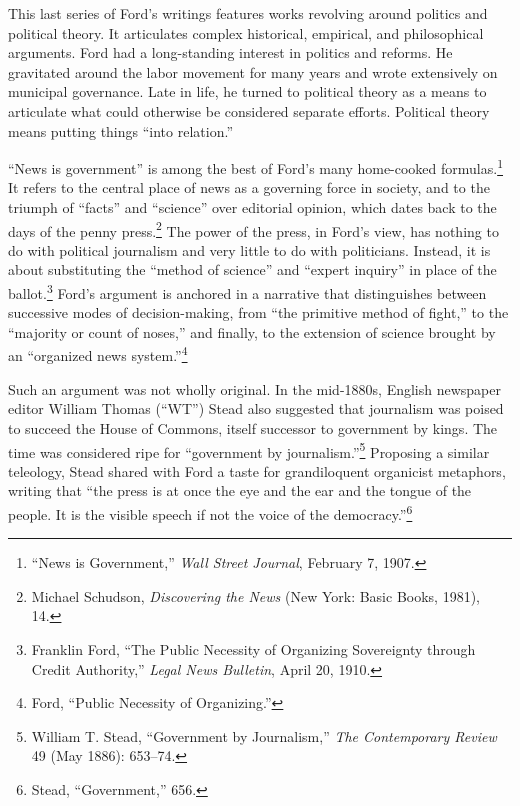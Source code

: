 \documentclass[twoside,symmetric,nobib,justified]{tufte-book}
\begin{document}
This last series of Ford's writings features works revolving around
politics and political theory. It articulates complex historical,
empirical, and philosophical arguments. Ford had a long-standing
interest in politics and reforms. He gravitated around the labor
movement for many years and wrote extensively on municipal governance.
Late in life, he turned to political theory as a means to articulate
what could otherwise be considered separate efforts. Political theory
means putting things ``into relation.''

``News is government'' is among the best of Ford's many home-cooked
formulas.\footnote{``News is Government,'' \emph{Wall Street Journal},
  February 7, 1907.} It refers to the central place of news as a
governing force in society, and to the triumph of ``facts'' and
``science'' over editorial opinion, which dates back to the days of the
penny press.\footnote{Michael Schudson, \emph{Discovering the News} (New
  York: Basic Books, 1981), 14.} The power of the press, in Ford's view,
has nothing to do with political journalism and very little to do with
politicians. Instead, it is about substituting the ``method of science''
and ``expert inquiry'' in place of the ballot.\footnote{Franklin Ford,
  ``The Public Necessity of Organizing Sovereignty through Credit
  Authority,'' \emph{Legal News Bulletin}, April 20, 1910.} Ford's
argument is anchored in a narrative that distinguishes between
successive modes of decision-making, from ``the primitive method of
fight,'' to the ``majority or count of noses,'' and finally, to the
extension of science brought by an ``organized news system.''\footnote{Ford,
  ``Public Necessity of Organizing.''}

Such an argument was not wholly original. In the mid-1880s, English
newspaper editor William Thomas (``WT'') Stead also suggested that
journalism was poised to succeed the House of Commons, itself successor
to government by kings. The time was considered ripe for ``government by
journalism.''\footnote{William T. Stead, ``Government by Journalism,''
  \emph{The Contemporary Review} 49 (May 1886): 653--74.} Proposing a
similar teleology, Stead shared with Ford a taste for grandiloquent
organicist metaphors, writing that ``the press is at once the eye and
the ear and the tongue of the people. It is the visible speech if not
the voice of the democracy.''\footnote{Stead, ``Government,'' 656.}
\end{document}
